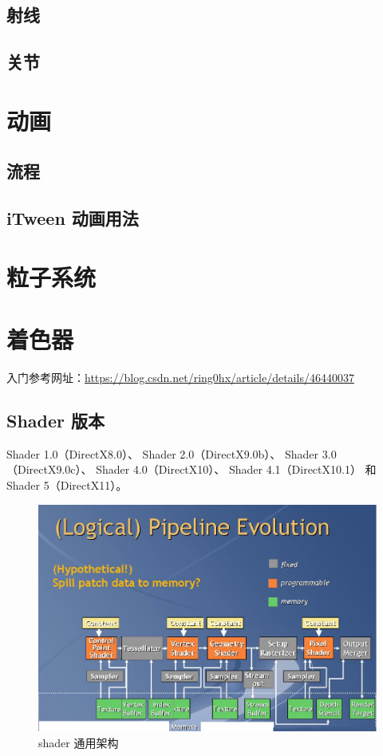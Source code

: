 \documentclass[UTF8,a4paper,12pt]{ctexbook}
\begin{document}
	
	\section{射线}
	
	
	\section{关节}
		
\chapter{动画}
	\section{流程}
		
		
	
	\section{iTween 动画用法}
		

\chapter{粒子系统}

		
\chapter{着色器}
	入门参考网址：\url{https://blog.csdn.net/ring0hx/article/details/46440037}
	
	\section{Shader 版本}
		Shader 1.0（DirectX8.0）、
		Shader 2.0（DirectX9.0b）、
		Shader 3.0（DirectX9.0c）、
		Shader 4.0（DirectX10）、
		Shader 4.1（DirectX10.1）
		和Shader 5（DirectX11）。

		\begin{figure}[H]
			\centering
			\includegraphics[scale=0.71]{ShaderArc}
			\caption{shader  通用架构}
		\end{figure}
		
\end{document}
